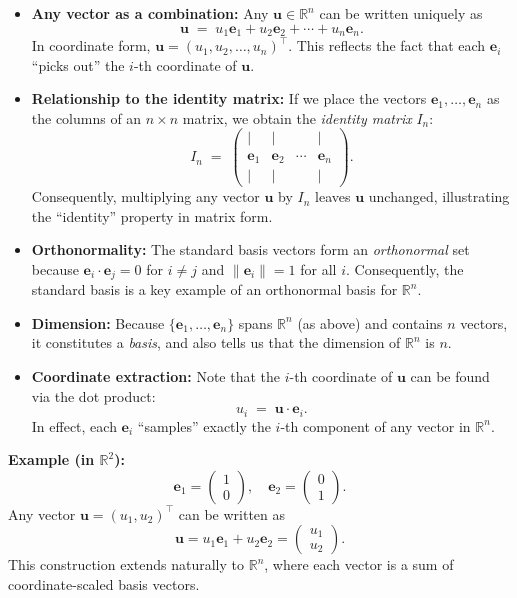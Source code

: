 \begin{itemize}
\item \textbf{Any vector as a combination:} 
      Any $\mathbf{u} \in \mathbb{R}^n$ can be written uniquely as
      \[
         \mathbf{u} 
         \;=\; u_1 \mathbf{e}_1 + u_2 \mathbf{e}_2 + \cdots + u_n \mathbf{e}_n.
      \]
      In coordinate form, $\mathbf{u} = (u_1, u_2, \dots, u_n)^\top$. This reflects the fact 
      that each $\mathbf{e}_i$ ``picks out'' the $i$-th coordinate of $\mathbf{u}$. 

\item \textbf{Relationship to the identity matrix:}
      If we place the vectors $\mathbf{e}_1, \dots, \mathbf{e}_n$ as the columns of an 
      $n \times n$ matrix, we obtain the \emph{identity matrix} $I_n$:
      \[
        I_n \;=\; 
        \begin{pmatrix}
        | & | &        & | \\
        \mathbf{e}_1 & \mathbf{e}_2 & \cdots & \mathbf{e}_n \\
        | & | &        & | 
        \end{pmatrix}.
      \]
      Consequently, multiplying any vector $\mathbf{u}$ by $I_n$ leaves $\mathbf{u}$ unchanged,
      illustrating the ``identity'' property in matrix form.

\item \textbf{Orthonormality:}
      The standard basis vectors form an \emph{orthonormal} set because 
      $\mathbf{e}_i \cdot \mathbf{e}_j = 0$ for $i \neq j$ and 
      $\|\mathbf{e}_i\| = 1$ for all $i$. Consequently, the standard basis 
      is a key example of an orthonormal basis for $\mathbb{R}^n$. 

\item \textbf{Dimension:}
      Because $\{\mathbf{e}_1,\dots,\mathbf{e}_n\}$ spans $\mathbb{R}^n$ (as above) 
      and contains $n$ vectors, it constitutes a \emph{basis}, and also tells us that 
      the dimension of $\mathbb{R}^n$ is $n$. 

\item \textbf{Coordinate extraction:}
      Note that the $i$-th coordinate of $\mathbf{u}$ can be found via the dot product:
      \[
        u_i \;=\; \mathbf{u} \cdot \mathbf{e}_i.
      \]
      In effect, each $\mathbf{e}_i$ ``samples'' exactly the $i$-th component of any vector 
      in $\mathbb{R}^n$.
\end{itemize}

\noindent
\textbf{Example (in $\mathbb{R}^2$):}
\[
\mathbf{e}_1 = 
\begin{pmatrix} 1 \\ 0 \end{pmatrix}, 
\quad
\mathbf{e}_2 = 
\begin{pmatrix} 0 \\ 1 \end{pmatrix}.
\]
Any vector \(\mathbf{u} = (u_1,u_2)^\top\) can be written as
\[
\mathbf{u} 
= u_1\mathbf{e}_1 + u_2\mathbf{e}_2
= \begin{pmatrix} u_1 \\ u_2 \end{pmatrix}.
\]
This construction extends naturally to $\mathbb{R}^n$, 
where each vector is a sum of coordinate-scaled basis vectors.

